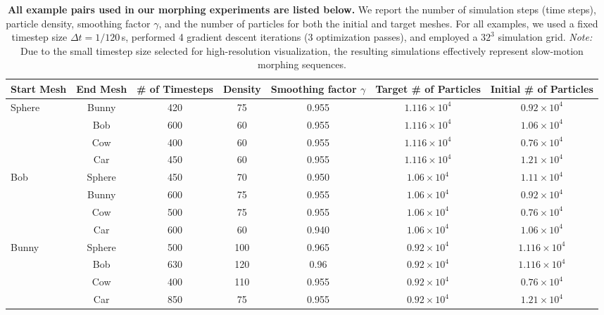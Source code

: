 \begin{table}[!ht]
\centering
\scriptsize
\caption[{All example pairs used in our morphing experiments}]{\textbf{All example pairs used in our morphing experiments are listed below.} We report the number of simulation steps (time steps), particle density, smoothing factor $\gamma$, and the number of particles for both the initial and target meshes. 
    For all examples, we used a fixed timestep size $\Delta t = 1/120$\,s, performed 4 gradient descent iterations (3 optimization passes), and employed a $32^3$ simulation grid. 
    \textit{Note:} Due to the small timestep size selected for high-resolution visualization, the resulting simulations effectively represent slow-motion morphing sequences.}

\begin{tabular}{l c c c c c c}
    \toprule
    \textbf{Start Mesh} & \textbf{End Mesh} & \textbf{\# of Timesteps} & \textbf{Density} & \textbf{Smoothing factor} \boldmath$\gamma$ & \textbf{Target \# of Particles} & \textbf{Initial \# of Particles} \\
    \midrule
    \multirow{4}{*}{Sphere}
      & Bunny & 420 & 75 & 0.955 & $1.116 \times 10^4$ & $0.92 \times 10^4$ \\
      & Bob   & 600 & 60 & 0.955 & $1.116 \times 10^4$ & $1.06 \times 10^4$ \\
      & Cow  & 400 & 60 & 0.955 & $1.116 \times 10^4$ & $0.76 \times 10^4$ \\
      & Car   & 450 & 60 & 0.955 & $1.116 \times 10^4$ & $1.21 \times 10^4$ \\
    \midrule
    \multirow{4}{*}{Bob}
      & Sphere & 450 & 70 & 0.950 & $1.06 \times 10^4$ & $1.11 \times 10^4$ \\
      & Bunny  & 600 & 75 & 0.955 & $1.06 \times 10^4$ & $0.92 \times 10^4$ \\
      & Cow   & 500 & 75 & 0.955 & $1.06 \times 10^4$ & $0.76 \times 10^4$ \\
      & Car    & 600 & 60 & 0.940 & $1.06 \times 10^4$ & $1.06 \times 10^4$ \\
    \midrule
    \multirow{4}{*}{Bunny}
      & Sphere & 500 & 100 & 0.965 & $0.92 \times 10^4$  & $1.116 \times 10^4$ \\
      & Bob    & 630 & 120 & 0.96  & $0.92 \times 10^4$  & $1.116 \times 10^4$ \\
      & Cow   & 400 & 110 & 0.955 & $0.92 \times 10^4$  & $0.76 \times 10^4$ \\
      & Car    & 850 & 75  & 0.955 & $0.92 \times 10^4$  & $1.21 \times 10^4$ \\

\end{tabular}
\end{table}
